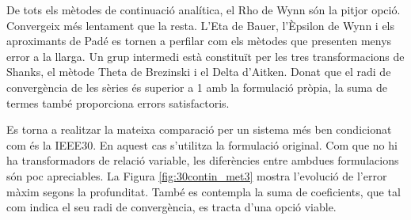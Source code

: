De tots els mètodes de continuació analítica, el Rho de Wynn són la pitjor opció. Convergeix més lentament que la resta. L'Eta de Bauer, l'Èpsilon de Wynn i els aproximants de Padé es tornen a perfilar com els mètodes que presenten menys error a la llarga. Un grup intermedi està constituït per les tres transformacions de Shanks, el mètode Theta de Brezinski i el Delta d'Aitken. Donat que el radi de convergència de les sèries és superior a 1 amb la formulació pròpia, la suma de termes també proporciona errors satisfactoris.

Es torna a realitzar la mateixa comparació per un sistema més ben condicionat com és la IEEE30. En aquest cas s'utilitza la formulació original. Com que no hi ha transformadors de relació variable, les diferències entre ambdues formulacions són poc apreciables. La Figura \ref{fig:30contin_met3} mostra l'evolució de l'error màxim segons la profunditat. També es contempla la suma de coeficients, que tal com indica el seu radi de convergència, es tracta d'una opció viable.

